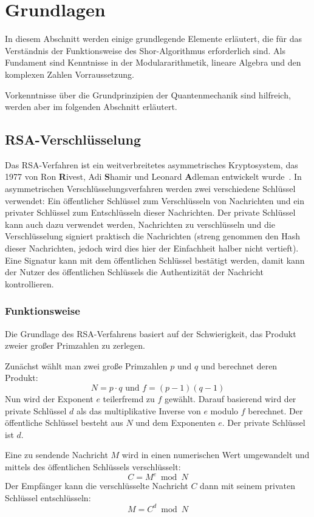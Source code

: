 \section{Grundlagen}
In diesem Abschnitt werden einige grundlegende Elemente erläutert, 
die für das Verständnis der Funktionsweise des Shor-Algorithmus erforderlich sind.
Als Fundament sind Kenntnisse in der Modulararithmetik, lineare Algebra und den komplexen Zahlen Vorraussetzung. 

Vorkenntnisse über die Grundprinzipien der Quantenmechanik sind hilfreich, 
werden aber im folgenden Abschnitt erläutert. 


\subsection{RSA-Verschlüsselung}
Das RSA-Verfahren ist ein weitverbreitetes asymmetrisches Kryptosystem, 
das 1977 von Ron \textbf{R}ivest, Adi \textbf{S}hamir und Leonard \textbf{A}dleman entwickelt wurde~\cite{10.1145/359340.359342}. 
In asymmetrischen Verschlüsselungsverfahren werden zwei verschiedene Schlüssel verwendet: 
Ein öffentlicher Schlüssel zum Verschlüsseln von Nachrichten und ein privater Schlüssel zum Entschlüsseln dieser Nachrichten.
Der private Schlüssel kann auch dazu verwendet werden, 
Nachrichten zu verschlüsseln und 
die Verschlüsselung signiert praktisch die Nachrichten 
(streng genommen den Hash dieser Nachrichten, jedoch wird dies hier der Einfachheit halber nicht vertieft).
Eine Signatur kann mit dem öffentlichen Schlüssel bestätigt werden, 
damit kann der Nutzer des öffentlichen Schlüssels die Authentizität der Nachricht kontrollieren.

\subsubsection*{Funktionsweise}
Die Grundlage des RSA-Verfahrens basiert auf der Schwierigkeit, 
das Produkt zweier großer Primzahlen zu zerlegen. 

Zunächst wählt man zwei große Primzahlen \(p\) und \(q\) und 
berechnet deren Produkt: 
\[N = p \cdot q \text{ und } f=(p-1)(q-1)\]  
Nun wird der Exponent \(e\) teilerfremd zu \(f\) gewählt.
Darauf basierend wird der private Schlüssel \(d\) als das multiplikative Inverse von \(e\) modulo \(f\) berechnet.
Der öffentliche Schlüssel besteht aus \(N\) und dem Exponenten \(e\). 
Der private Schlüssel ist \(d\).

Eine zu sendende Nachricht \( M \) wird in einen numerischen Wert umgewandelt und mittels des öffentlichen Schlüssels verschlüsselt:
\[
  C = M^e \bmod N
\]
Der Empfänger kann die verschlüsselte Nachricht \(C\) dann mit seinem privaten Schlüssel entschlüsseln:
\[
  M = C^d \bmod N
\]

